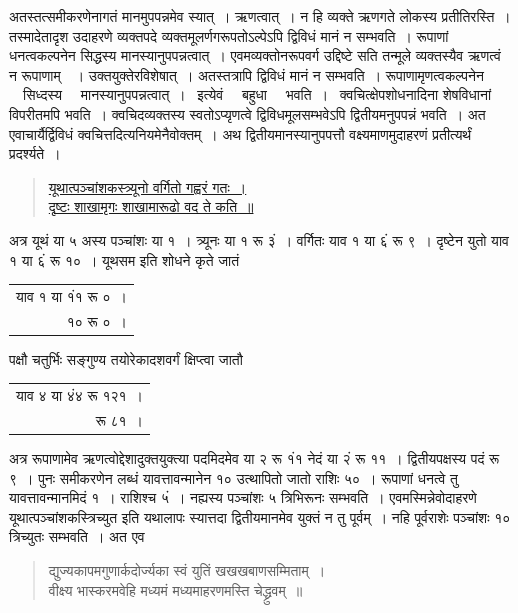 \documentclass[11pt, openany]{book}
\begin{document}
अतस्तत्समीकरणेनागतं मानमुपपन्नमेव स्यात्~। ऋणत्वात्~। न हि
व्यक्ते ऋणगते 
लोकस्य प्रतीतिरस्ति~। तस्मादेतादृश उदाहरणे व्यक्तपदे
व्यक्तमूलर्णगरूपतोऽल्पेऽपि 
द्विविधं मानं न सम्भवति~। रूपाणां धनत्वकल्पनेन सिद्धस्य
मानस्यानुपपन्नत्वात्~। 
एवमव्यक्तोनरूपवर्ग उद्दिष्टे सति तन्मूले व्यक्तस्यैव ऋणत्वं न रूपाणाम्~~। 
उक्तयुक्तेरविशेषात्~। अतस्तत्रापि द्विविधं मानं न सम्भवति~।
रूपाणामृणत्वकल्पनेन ~~सिध्दस्य ~~मानस्यानुपपन्नत्वात्~। ~इत्येवं ~~बहुधा ~~भवति~। ~क्वचित्क्षेपशोधनादिना 
शेषविधानां विपरीतमपि भवति~। क्वचिदव्यक्तस्य स्वतोऽप्यृणत्वे
द्विविधमूलसम्भवेऽपि 
द्वितीयमनुपपन्नं भवति~। अत एवाचार्यैर्द्विविधं
क्वचित्तदित्यनियमेनैवोक्तम्~। अथ 
द्वितीयमानस्यानुपपत्तौ वक्ष्यमाणमुदाहरणं प्रतीत्यर्थं प्रदर्श्यते~। 
\begin{quote}
\hyperref[125]{यूथात्पञ्चांशकस्त्र्यूनो वर्गितो गह्वरं गतः~। \\
 दृष्टः शाखामृगः शाखामारूढो वद ते कति~॥}
\end{quote}
\newpage
\indent अत्र यूथं या ५ अस्य पञ्चांशः या १~। त्र्यूनः या १ रू ३ं~। वर्गितः याव १ या ६ं रू ९~। दृष्टेन युतो याव १ या ६ं रू १०~। यूथसम इति शोधने
कृते जातं 
\vspace{-2mm}

\begin{table}[h!]
    \centering\s
    \begin{tabular}{r}
     याव १ या १ं१ रू ०~।  \\
१० रू ०~। 
    \end{tabular}
\end{table}
\vspace{-2mm}

\noindent पक्षौ चतुर्भिः सङ्गुण्य तयोरेकादशवर्गं क्षिप्त्वा जातौ 
\vspace{-2mm}

\begin{table}[h!]
    \centering\s
    \begin{tabular}{r}
       याव ४ या ४ं४ रू १२१~। \\
 रू ८१~।
    \end{tabular}
\end{table}
\vspace{-2mm}

 अत्र रूपाणामेव ऋणत्वोद्देशादुक्तयुक्त्या पदमिदमेव या २ रू १ं१ नेदं
या २ं रू ११~। द्वितीयपक्षस्य पदं रू ९~। पुनः समीकरणेन लब्धं यावत्तावन्मानेन
१० उत्थापितो जातो राशिः ५०~। रूपाणां धनत्वे तु यावत्तावन्मानमिदं १~। 
राशिश्च ५ं~। नह्यस्य पञ्चांशः ५ त्रिभिरूनः सम्भवति~। एवमस्मिन्नेवोदाहरणे
यूथात्पञ्चांशकस्त्रिच्युत इति यथालापः स्यात्तदा द्वितीयमानमेव युक्तं न
तु 
पूर्वम्~। नहि पूर्वराशेः पञ्चांशः १० त्रिच्युतः सम्भवति~। अत एव\textendash
\begin{quote}
     {\qt द्युज्यकापमगुणार्कदोर्ज्यका स्वं युतिं खखखबाणसम्मिताम्~। \\
 वीक्ष्य भास्करमवेहि मध्यमं मध्यमाहरणमस्ति चेद्ध्रुवम्~॥~}
\end{quote}
\end{document}
